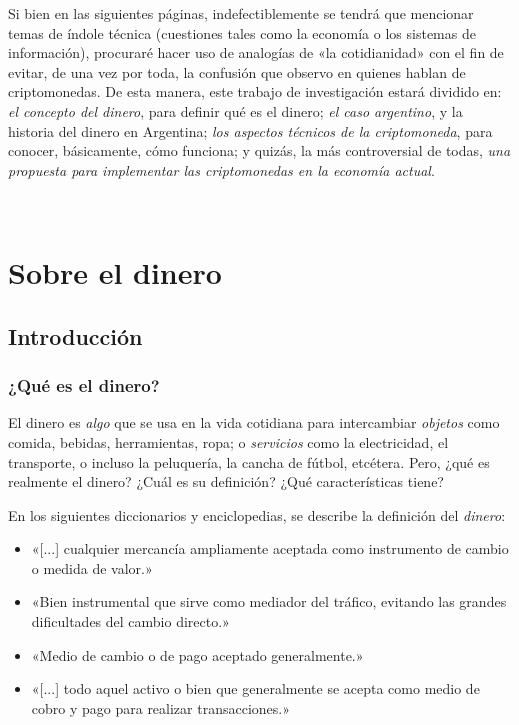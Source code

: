 \documentclass[12pt,a4paper,twoside]{book}
\begin{document}
Si bien en las siguientes páginas, indefectiblemente se tendrá que mencionar temas de índole técnica (cuestiones tales como la economía o los sistemas de información), procuraré hacer uso de analogías de «la cotidianidad» con el fin de evitar, de una vez por toda, la confusión que observo en quienes hablan de criptomonedas. De esta manera, este trabajo de investigación estará dividido en: \textit{el concepto del dinero}, para definir qué es el dinero; \textit{el caso argentino}, y la historia del dinero en Argentina; \textit{los aspectos técnicos de la criptomoneda}, para conocer, básicamente, cómo funciona; y quizás, la más controversial de todas, \textit{una propuesta para implementar las criptomonedas en la economía actual}.

\newpage

\setcounter{secnumdepth}{1}
\thispagestyle{empty}
\
\renewcommand{\thepage}{\arabic{page}}
\part{Sobre el dinero}
\chapter{Introducción}
\section{¿Qué es el dinero?}
El dinero es \textit{algo} que se usa en la vida cotidiana para intercambiar \textit{objetos} como comida, bebidas, herramientas, ropa; o \textit{servicios} como la electricidad, el transporte, o incluso la peluquería, la cancha de fútbol, etcétera. Pero, ¿qué es realmente el dinero? ¿Cuál es su definición? ¿Qué características tiene? 

En los siguientes diccionarios y enciclopedias, se describe la definición del \textit{dinero}:

\begin{itemize}
\item «[...] cualquier mercancía ampliamente aceptada como instrumento de cambio o medida de valor.» \cite[pág. 3807]{dic:espasacalpe}
\item «Bien instrumental que sirve como mediador del tráfico, evitando las grandes dificultades del cambio directo.» \cite{dic:clarin}
\item «Medio de cambio o de pago aceptado generalmente.» \cite{rae}
\item «[...] todo aquel activo o bien que generalmente se acepta como medio de cobro y pago para realizar transacciones.» \cite{epedia:dinero}
\end{itemize}
\end{document}
